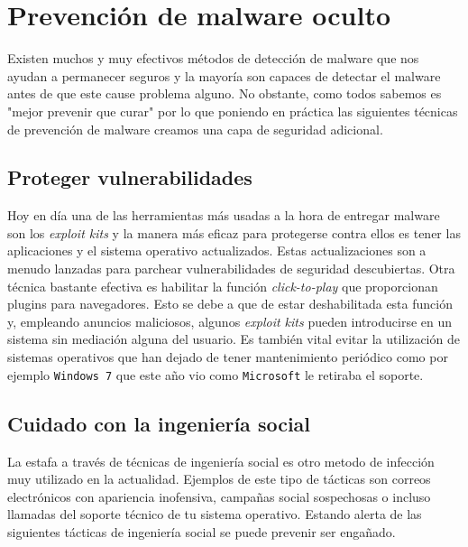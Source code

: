 \documentclass[12pt]{article}
\begin{document}
    \section{Prevención de malware oculto}
        Existen muchos y muy efectivos métodos de detección de malware que nos ayudan a permanecer seguros y la mayoría son capaces de detectar el malware antes de que este cause problema alguno. No obstante, como todos sabemos es "mejor prevenir que curar" por lo que poniendo en práctica las siguientes técnicas de prevención de malware creamos una capa de seguridad adicional.

        \subsection{Proteger vulnerabilidades}
            Hoy en día una de las herramientas más usadas a la hora de entregar malware son los \textit{exploit kits} y la manera más eficaz para protegerse contra ellos es tener las aplicaciones y el sistema operativo actualizados. Estas actualizaciones son a menudo lanzadas para parchear vulnerabilidades de seguridad descubiertas. Otra técnica bastante efectiva es habilitar la función \textit{click-to-play} que proporcionan plugins para navegadores. Esto se debe a que de estar deshabilitada esta función y, empleando anuncios maliciosos, algunos \textit{exploit kits} pueden introducirse en un sistema sin mediación alguna del usuario. Es también vital evitar la utilización de sistemas operativos que han dejado de tener mantenimiento periódico como por ejemplo \texttt{Windows 7} que este año vio como \texttt{Microsoft} le retiraba el soporte.

        \subsection{Cuidado con la ingeniería social}
            La estafa a través de técnicas de ingeniería social es otro metodo de infección muy utilizado en la actualidad. Ejemplos de este tipo de tácticas son correos electrónicos con apariencia inofensiva, campañas social sospechosas o incluso llamadas del soporte técnico de tu sistema operativo. Estando alerta de las siguientes tácticas de ingeniería social se puede prevenir ser engañado.
\end{document}
